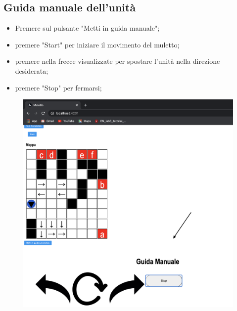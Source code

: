 \subsection{Guida manuale dell'unità}
\begin{itemize}
    \item Premere sul pulsante "Metti in guida manuale";
    \item premere "Start" per iniziare il movimento del muletto;
    \item premere nella frecce visualizzate per spostare l'unità nella direzione desiderata;
    \item premere "Stop" per fermarsi;
\end{itemize}
\begin{figure}[H]
    \centering
    \includegraphics[scale=0.4]{res/images/forklift_guidamanuale.png}
\end{figure}
